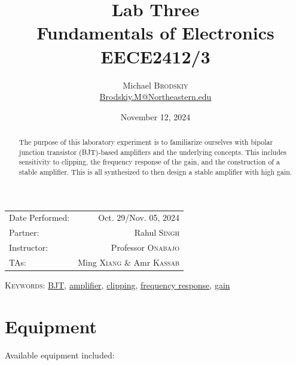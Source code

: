 \documentclass[
	letterpaper, %
	10pt, %
]{CSUniSchoolLabReport}
\title{Lab Three\\ Fundamentals of Electronics \\ EECE2412/3} %
\author{Michael \textsc{Brodskiy}\\ \small \href{mailto:Brodskiy.M@Northeastern.edu}{Brodskiy.M@Northeastern.edu}}
\date{November 12, 2024} %
\begin{document}
\maketitle %

\begin{center}
	\begin{tabular}{l r}
        Date Performed: & Oct. 29/Nov. 05, 2024 \\ %
        Partner: & Rahul \textsc{Singh} \\ %
		Instructor: & Professor \textsc{Onabajo} \\ %
        TAs: & Ming \textsc{Xiang} \& Amr \textsc{Kassab} \\ %
	\end{tabular}
\end{center}

\newpage

\begin{abstract}

  The purpose of this laboratory experiment is to familiarize ourselves with bipolar junction transistor (BJT)-based amplifiers and the underlying concepts. This includes sensitivity to clipping, the frequency response of the gain, and the construction of a stable amplifier. This is all synthesized to then design a stable amplifier with high gain.

\end{abstract}

\begin{flushleft}

  \textsc{Keywords:} \underline{BJT}, \underline{amplifier}, \underline{clipping}, \underline{frequency response}, \underline{gain}

\end{flushleft}

\newpage

\tableofcontents
\listoffigures

\newpage

\section{Equipment}

Available equipment included:\\
\end{document}
